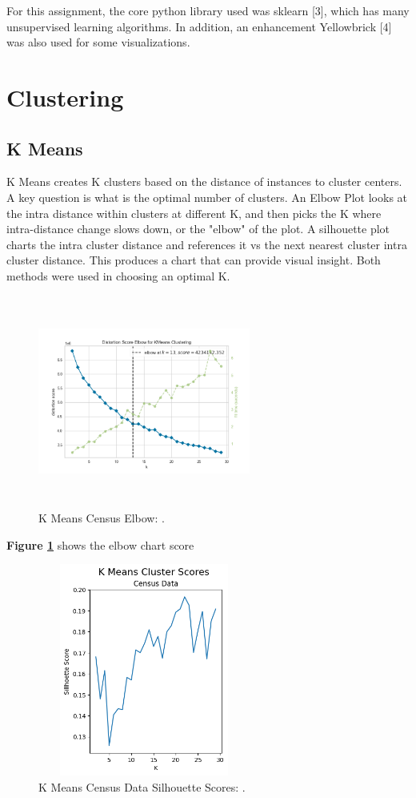 \documentclass[letterpaper]{article} %
\begin{document}
For this assignment, the core python library used was sklearn [3], which has many unsupervised learning algorithms.  In addition, an enhancement Yellowbrick [4] was also used for some visualizations.


\section{Clustering}
\subsection{K Means}
K Means creates K clusters based on the distance of instances to cluster centers.  A key question is what is the optimal number of clusters.  An Elbow Plot looks at the intra distance within clusters at different K, and then picks the K where intra-distance change slows down, or the "elbow" of the plot.  A silhouette plot charts the  intra cluster distance and references it vs the next nearest cluster intra cluster distance.  This produces a chart that can provide visual insight.  Both methods were used in choosing an optimal K.

\begin{figure}[!htb]
\centering
\includegraphics[width=2.75in, height=2.75in]{figures/Census_elbow_max_30_best_13.png}
\caption{K Means Census Elbow:  . }
\label{fig:kmeans_census_elbow}
\end{figure}

\textbf{Figure \ref{fig:kmeans_census_elbow}} shows the elbow chart score


\begin{figure}[!htb]
\centering
\includegraphics[width=2.75in, height=2.75in]{figures/K_Means_Cluster_Scores_Census_Data.png}
\caption{K Means Census Data Silhouette Scores:  . }
\label{fig:kmeans_census_silhouette}
\end{figure}
\end{document}
